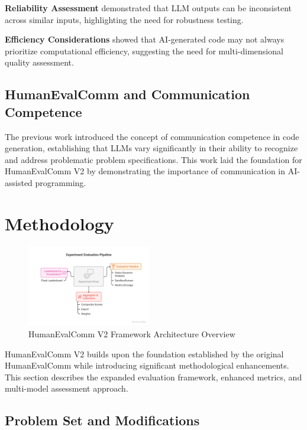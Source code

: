 \documentclass[conference]{IEEEtran}
\begin{document}
\textbf{Reliability Assessment} \cite{chen2021evaluating} demonstrated that LLM outputs can be inconsistent across similar inputs, highlighting the need for robustness testing.

\textbf{Efficiency Considerations} \cite{nijkamp2022codegen} showed that AI-generated code may not always prioritize computational efficiency, suggesting the need for multi-dimensional quality assessment.

\subsection{HumanEvalComm and Communication Competence}

The previous work \cite{wu2025humanevalcomm} introduced the concept of communication competence in code generation, establishing that LLMs vary significantly in their ability to recognize and address problematic problem specifications. This work laid the foundation for HumanEvalComm V2 by demonstrating the importance of communication in AI-assisted programming.

\section{Methodology}
\begin{figure}[ht]
    \centering
    \includegraphics[width=0.48\textwidth]{../architecture.png}
    \caption{HumanEvalComm V2 Framework Architecture Overview}
    \label{fig:architecture-overview}
\end{figure}

HumanEvalComm V2 builds upon the foundation established by the original HumanEvalComm while introducing significant methodological enhancements. This section describes the expanded evaluation framework, enhanced metrics, and multi-model assessment approach.

\subsection{Problem Set and Modifications}
\end{document}
